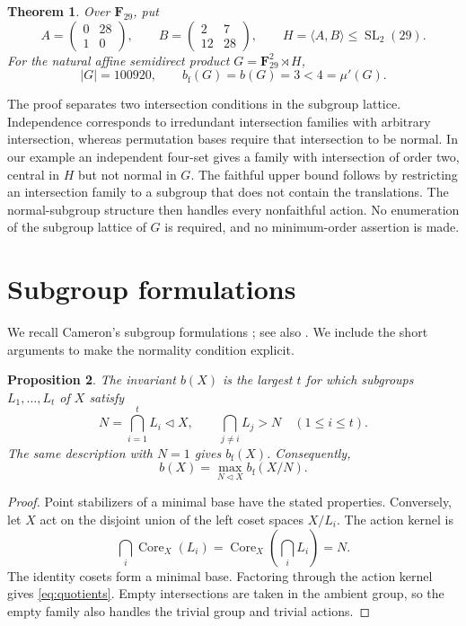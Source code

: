 \IfFileExists{baustms.cls}{\bulletinformattrue\documentclass[plain]{baustms}}{\bulletinformatfalse\documentclass[11pt]{amsart}}
\theoremstyle{cupthm}
\newtheorem{theorem}{Theorem}
\newtheorem{proposition}[theorem]{Proposition}
\newcommand{\F}{\mathbf F}
\newcommand{\mup}{\mu'}
\newcommand{\bfth}{b_{\mathrm f}}
\newcommand{\SL}{\operatorname{SL}}
\newcommand{\Core}{\operatorname{Core}}
\begin{document}
\begin{theorem}\label{thm:main}
Over $\F_{29}$, put
\[
 A=\begin{pmatrix}0&28\\1&0\end{pmatrix},\qquad
 B=\begin{pmatrix}2&7\\12&28\end{pmatrix},\qquad
 H=\langle A,B\rangle\le\SL_2(29).
\]
For the natural affine semidirect product $G=\F_{29}^2\rtimes H$,
\[
 |G|=100920,\qquad \bfth(G)=b(G)=3<4=\mup(G).
\]
\end{theorem}

The proof separates two intersection conditions in the subgroup lattice.
Independence corresponds to irredundant intersection families with arbitrary
intersection, whereas permutation bases require that intersection to be
normal. In our example an independent four-set gives a family with
intersection of order two, central in $H$ but not normal in $G$.
The faithful upper bound follows by restricting an intersection family to
a subgroup that does not contain the translations. The normal-subgroup
structure then handles every nonfaithful action.
No enumeration of the subgroup lattice of $G$ is required, and no
minimum-order assertion is made.

\section{Subgroup formulations}
We recall Cameron's subgroup formulations
\cite[Propositions 3.1--3.2 and Corollary 3.3]{cameron2014};
see also \cite{cameron2024}. We include the short arguments to make the
normality condition explicit.

\begin{proposition}\label{prop:bases}
The invariant $b(X)$ is the largest $t$ for which subgroups
$L_1,\ldots,L_t$ of $X$ satisfy
\[
 N=\bigcap_{i=1}^t L_i\lhd X,\qquad
 \bigcap_{j\ne i}L_j>N\quad(1\le i\le t).
\]
The same description with $N=1$ gives $\bfth(X)$. Consequently,
\begin{equation}\label{eq:quotients}
 b(X)=\max_{N\lhd X}\bfth(X/N).
\end{equation}
\end{proposition}
\begin{proof}
Point stabilizers of a minimal base have the stated properties.
Conversely, let $X$ act on the disjoint union of the left coset spaces
$X/L_i$. The action kernel is
\[
 \bigcap_i\Core_X(L_i)
 =\Core_X\!\left(\bigcap_i L_i\right)=N.
\]
The identity cosets form a minimal base. Factoring through the action kernel
gives \eqref{eq:quotients}. Empty intersections are taken in the ambient
group, so the empty family also handles the trivial group and trivial actions.
\end{proof}
\end{document}
